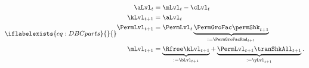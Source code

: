   \begin{equation}\iflabelexists{eq:DBCparts}{}{\label{eq:DBCparts}} %
    \begin{split}
      \aLvl_{t}     & = \mLvl_{t}-\cLvl_{t}  \\
      \kLvl_{t+1}   & = \aLvl_{t} \notag \\
      \PermLvl_{t+1}  & = \PermLvl_{t} \underbrace{\PermGroFac\permShk_{t+1}}_{:= \PermGroFacRnd_{t+1}} \notag \\
      \mLvl_{t+1}  & =   \underbrace{\Rfree \kLvl_{t+1}}_{:= \bLvl_{t+1}}  +\underbrace{\PermLvl_{t+1}\tranShkAll_{t+1}}_{:= \yLvl_{t+1}}. \notag
    \end{split}
  \end{equation}
